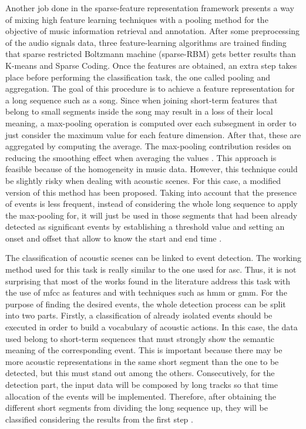 	Another job done in the sparse-feature representation framework presents a way of mixing high feature learning techniques with a pooling method for the objective of music information retrieval and annotation. After some preprocessing of the audio signals data, three feature-learning algorithms are trained finding that sparse restricted Boltzmann machine (sparse-RBM) gets better results than K-means and Sparse Coding. Once the features are obtained, an extra step takes place before performing the classification task, the one called pooling and aggregation. The goal of this procedure is to achieve a feature representation for a long sequence such as a song. Since when joining short-term features that belong to small segments inside the song may result in a loss of their local meaning, a max-pooling operation is computed over each subsegment in order to just consider the maximum value for each feature dimension. After that, these are aggregated by computing the average. The max-pooling contribution resides on reducing the smoothing effect when averaging the values \cite{Nam2012}. This approach is feasible because of the homogeneity in music data. However, this technique could be slightly risky when dealing with acoustic scenes. For this case, a modified version of this method has been proposed. Taking into account that the presence of events is less frequent, instead of considering the whole long sequence to apply the max-pooling for, it will just be used in those segments that had been already detected as significant events by establishing a threshold value and setting an onset and offset that allow to know the start and end time \cite{Lee2013}. 
	
	The classification of acoustic scenes can be linked to event detection. The working method used for this task is really similar to the one used for \acrshort{asc}. Thus, it is not surprising that most of the works found in the literature address this task with the use of \acrshort{mfcc} as features and with techniques such as \acrshort{hmm} or \acrshort{gmm}. For the purpose of finding the desired events, the whole detection process can be split into two parts. Firstly, a classification of already isolated events should be executed in order to build a vocabulary of acoustic actions. In this case, the data used belong to short-term sequences that must strongly show the semantic meaning of the corresponding event. This is important because there may be more acoustic representations in the same short segment than the one to be detected, but this must stand out among the others.  Consecutively, for the detection part, the input data will be composed by long tracks so that time allocation of the events will be implemented. Therefore, after obtaining the different short segments from dividing the long sequence up, they will be classified considering the results from the first step \cite{Mesaros2010}. 
	
